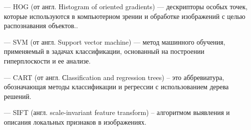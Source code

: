 \begin{abbreviations}
	\item[---] HOG (от англ. Histogram of oriented gradients) --- дескрипторы особых точек, которые используются в компьютерном зрении и обработке изображений с целью распознавания объектов.. 
	\item[---] SVM (от англ. Support vector machine) --- метод машинного обучения, применяемый в задачах классификации, основанный на построении гиперплоскости и ее анализе.
	\item[---] CART (от англ. Сlassification and regression trees) -- это аббревиатура, обозначающая методы классификации и регрессии с использованием дерева решений.
	\item[---] SIFT (англ. scale-invariant feature transform) -- алгоритмом выявления и описания локальных признаков в изображениях.
\end{abbreviations}